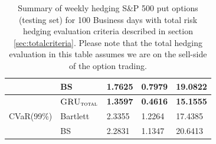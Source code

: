 \documentclass[letterpaper,12pt,titlepage,oneside,final]{book}
\numberwithin{equation}{section}
\theoremstyle{definition}
\newcommand{\modelT}{\textsc{GRU}_{\textsc{total}}}
\begin{document}
\begin{table}[htp!]
\begin{tabular}{ll|l|l|l|}
		\multicolumn{1}{|l|}{}                                & BS       	 & 1.7625  		&0.7979 		   &19.0822          \\ 
		\hline
		\multicolumn{1}{|l|}{\multirow{3}{*}{CVaR(99\%)}}     & $\modelT$    & \textbf{1.3597} & \textbf{0.4616} & \textbf{15.1555} \\  
		\multicolumn{1}{|l|}{}                                & Bartlett     &2.3355  			&1.2264 		   &17.4385          \\ 
		\multicolumn{1}{|l|}{}                                & BS       	 & 2.2831  		&1.1347 		   &20.6413          \\ \hline
	\end{tabular}
	\caption{Summary of weekly hedging S\&P 500 put options (testing set) for 100 Business days with total risk hedging evaluation criteria described in section \ref{sec:totalcriteria}. Please note that the total hedging evaluation in this table assumes we are on the sell-side of the option trading.} \label{table:putTotalW}
\end{table}
\end{document}
